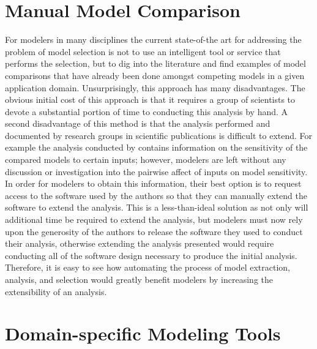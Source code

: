 \section{Manual Model Comparison\label{sec:manual_model_compare}}
For modelers in many disciplines the current state-of-the art for addressing the problem of model selection is not to use an intelligent tool or service that performs the selection, but to dig into the literature and find examples of model comparisons that have already been done amongst competing models in a given application domain.
Unsurprisingly, this approach has many disadvantages.
The obvious initial cost of this approach is that it requires a group of scientists to devote a substantial portion of time to conducting this analysis by hand.
A second disadvantage of this method is that the analysis performed and documented by research groups in scientific publications is difficult to extend.
For example the analysis conducted by \citet{camargo2016six} contains information on the sensitivity of the compared models to certain inputs; however, modelers are left without any discussion or investigation into the pairwise affect of inputs on model sensitivity.
In order for modelers to obtain this information, their best option is to request access to the software used by the authors so that they can manually extend the software to extend the analysis.
This is a less-than-ideal solution as not only will additional time be required to extend the analysis, but modelers must now rely upon the generosity of the authors to release the software they used to conduct their analysis, otherwise extending the analysis presented would require conducting all of the software design necessary to produce the initial analysis.
Therefore, it is easy to see how automating the process of model extraction, analysis, and selection would greatly benefit modelers by increasing the extensibility of an analysis.

\section{Domain-specific Modeling Tools\label{sec:domain_model_tools}}


